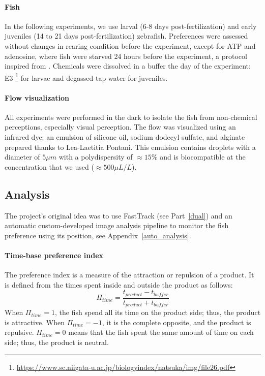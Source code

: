   \paragraph{Fish} In the following experiments, we use larval (6-8 days post-fertilization) and early juveniles (14 to 21 days post-fertilization) zebrafish. Preferences were assessed without changes in rearing condition before the experiment, except for ATP and adenosine, where fish were starved 24 hours before the experiment, a protocol inspired from \cite{wakisaka2017adenosine}. Chemicals were dissolved in a buffer the day of the experiment: E3 \footnote{\url{https://www.sc.niigata-u.ac.jp/biologyindex/natsuka/img/file26.pdf}} for larvae and degassed tap water for juveniles.

  \paragraph{Flow visualization} All experiments were performed in the dark to isolate the fish from non-chemical perceptions, especially visual perception. The flow was visualized using an infrared dye: an emulsion of silicone oil, sodium dodecyl sulfate, and alginate prepared thanks to Lea-Laetitia Pontani. This emulsion contains droplets with a diameter of $5 \mu m$ with a polydispersity of $\approx 15 \%$ and is biocompatible \cite{ali2011large} at the concentration that we used ($\approx 500 \mu L/L$).

  \subsection{Analysis}
  The project's original idea was to use FastTrack (see Part~\ref{dual}) and an automatic custom-developed image analysis pipeline to monitor the fish preference using its position, see Appendix~\ref{auto_analysis}.

  \paragraph{Time-base preference index} The preference index is a measure of the attraction or repulsion of a product. It is defined from the times spent inside and outside the product as follows:
  \begin{equation}
    \Pi_{time}=\frac{t_{product}-t_{buffer}}{t_{product}+t_{buffer}}
  \end{equation}
  \noindent When $\Pi_{time} = 1$, the fish spend all its time on the product side; thus, the product is attractive. When $\Pi_{time} = -1$, it is the complete opposite, and the product is repulsive. $\Pi_{time} = 0$ means that the fish spent the same amount of time on each side; thus, the product is neutral.

